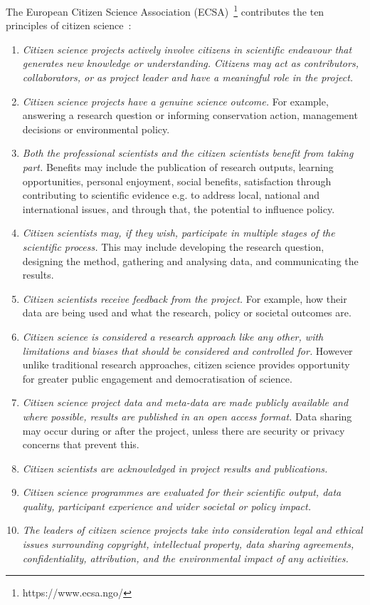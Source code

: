 The European Citizen Science Association (ECSA)~\footnote{https://www.ecsa.ngo/} contributes the ten principles of citizen science~\cite{ecsa2015ten}:

\begin{enumerate}
\item \textit{Citizen science projects actively involve citizens in scientific endeavour that generates new
knowledge or understanding. Citizens may act as contributors, collaborators, or as project
leader and have a meaningful role in the project.}
\item \textit{Citizen science projects have a genuine science outcome.} For example, answering a research
question or informing conservation action, management decisions or environmental policy.
\item \textit{Both the professional scientists and the citizen scientists benefit from taking part.} Benefits
may include the publication of research outputs, learning opportunities, personal enjoyment,
social benefits, satisfaction through contributing to scientific evidence e.g. to address local,
national and international issues, and through that, the potential to influence policy.
\item \textit{Citizen scientists may, if they wish, participate in multiple stages of the scientific process.} This may include developing the research question, designing the method, gathering and
analysing data, and communicating the results.
\item \textit{Citizen scientists receive feedback from the project.} For example, how their data are being used
and what the research, policy or societal outcomes are.
\item \textit{Citizen science is considered a research approach like any other, with limitations and biases
that should be considered and controlled for.} However unlike traditional research approaches,
citizen science provides opportunity for greater public engagement and democratisation of
science.
\item \textit{Citizen science project data and meta-data are made publicly available and where possible,
results are published in an open access format.} Data sharing may occur during or after the
project, unless there are security or privacy concerns that prevent this.
\item \textit{Citizen scientists are acknowledged in project results and publications.}
\item \textit{Citizen science programmes are evaluated for their scientific output, data quality, participant
experience and wider societal or policy impact.}
\item \textit{The leaders of citizen science projects take into consideration legal and ethical issues
surrounding copyright, intellectual property, data sharing agreements, confidentiality,
attribution, and the environmental impact of any activities.}
\end{enumerate}
